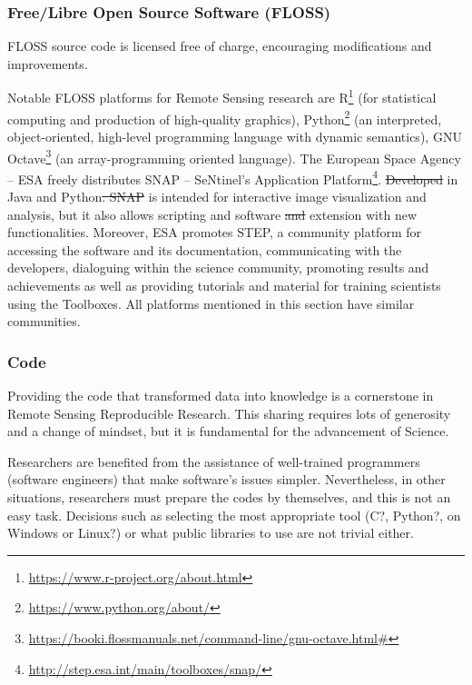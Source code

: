 \documentclass[journal,twoside]{IEEEtran}
\providecommand{\DIFadd}[1]{{\protect\color{blue}\uwave{#1}}} %
\providecommand{\DIFdel}[1]{{\protect\color{red}\sout{#1}}}                      %
\providecommand{\DIFaddbegin}{} %
\providecommand{\DIFaddend}{} %
\providecommand{\DIFdelbegin}{} %
\providecommand{\DIFdelend}{} %
\newcommand{\DIFscaledelfig}{0.5}
\newlength{\DIFdelgraphicswidth} %
\newlength{\DIFdelgraphicsheight} %
\newcommand{\DIFaddincludegraphics}[2][]{{\color{blue}\fbox{\DIFOincludegraphics[#1]{#2}}}} %
\newcommand{\DIFdelincludegraphics}[2][]{%
\sbox{\DIFdelgraphicsbox}{\DIFOincludegraphics[#1]{#2}}%
\settoboxwidth{\DIFdelgraphicswidth}{\DIFdelgraphicsbox} %
\settoboxtotalheight{\DIFdelgraphicsheight}{\DIFdelgraphicsbox} %
\scalebox{\DIFscaledelfig}{%
\parbox[b]{\DIFdelgraphicswidth}{\usebox{\DIFdelgraphicsbox}\\[-\baselineskip] \rule{\DIFdelgraphicswidth}{0em}}\llap{\resizebox{\DIFdelgraphicswidth}{\DIFdelgraphicsheight}{%
\setlength{\unitlength}{\DIFdelgraphicswidth}%
\begin{picture}(1,1)%
\thicklines\linethickness{2pt} %
{\color[rgb]{1,0,0}\put(0,0){\framebox(1,1){}}}%
{\color[rgb]{1,0,0}\put(0,0){\line( 1,1){1}}}%
{\color[rgb]{1,0,0}\put(0,1){\line(1,-1){1}}}%
\end{picture}%
}\hspace*{3pt}}} %
} %
\DeclareRobustCommand{\DIFaddbegin}{\DIFOaddbegin \let\includegraphics\DIFaddincludegraphics} %
\DeclareRobustCommand{\DIFaddend}{\DIFOaddend \let\includegraphics\DIFOincludegraphics} %
\DeclareRobustCommand{\DIFdelbegin}{\DIFOdelbegin \let\includegraphics\DIFdelincludegraphics} %
\DeclareRobustCommand{\DIFdelend}{\DIFOaddend \let\includegraphics\DIFOincludegraphics} %
\begin{document}
\subsubsection{Free/Libre Open Source Software (FLOSS)}

FLOSS source code is licensed free of charge, encouraging modifications and improvements.

Notable FLOSS platforms for Remote Sensing research are 
R\footnote{\url{https://www.r-project.org/about.html}} (for statistical computing and production of high-quality graphics),
Python\footnote{\url{https://www.python.org/about/}} (an interpreted, object-oriented, high-level programming language with dynamic semantics),
GNU Octave\footnote{\url{https://booki.flossmanuals.net/command-line/gnu-octave.html#}} (an array-programming oriented language).
The European Space Agency -- ESA freely distributes SNAP -- SeNtinel’s Application Platform\footnote{\url{http://step.esa.int/main/toolboxes/snap/}}.
\DIFdelbegin \DIFdel{Developed }\DIFdelend \DIFaddbegin \DIFadd{SNAP, developed }\DIFaddend in Java and Python\DIFdelbegin \DIFdel{.
SNAP }\DIFdelend \DIFaddbegin \DIFadd{,
}\DIFaddend is intended for interactive image visualization and analysis, but it also allows scripting and software \DIFdelbegin \DIFdel{and }\DIFdelend extension with new functionalities.
Moreover, ESA promotes STEP, a community platform for accessing the software and its documentation, communicating with the developers, dialoguing within the science community, promoting results and achievements as well as providing tutorials and material for training scientists using the Toolboxes.
All platforms mentioned in this section have similar communities.

\subsubsection{Code}

Providing the code that transformed data into knowledge is a cornerstone in Remote Sensing Reproducible Research.
This sharing requires lots of generosity and a change of mindset, but it is fundamental for the advancement of Science.

Researchers are benefited from the assistance of well-trained programmers (software engineers) that make software's issues simpler. 
Nevertheless, in other situations, researchers must prepare the codes by themselves, and this is not an easy task. 
Decisions such as selecting the most appropriate tool (C?, Python?, on Windows or Linux?) or what public libraries to use are not trivial either.
\end{document}
